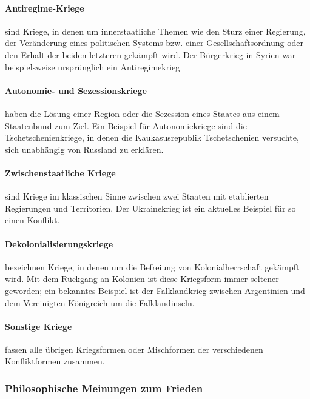 \documentclass{article}
\begin{document}
	\paragraph{Antiregime-Kriege}
	sind Kriege, in denen um innerstaatliche Themen wie den Sturz einer Regierung, der Veränderung eines politischen Systems bzw. einer Gesellschaftsordnung oder den Erhalt der beiden letzteren gekämpft wird. Der Bürgerkrieg in Syrien war beispielsweise ursprünglich ein Antiregimekrieg

	\paragraph{Autonomie- und Sezessionskriege}
	haben die Lösung einer Region oder die Sezession eines Staates aus einem Staatenbund zum Ziel. Ein Beispiel für Autonomiekriege sind die Tschetschenienkriege, in denen die Kaukasusrepublik Tschetschenien versuchte, sich unabhängig von Russland zu erklären.

	\paragraph{Zwischenstaatliche Kriege}
	sind Kriege im klassischen Sinne zwischen zwei Staaten mit etablierten Regierungen und Territorien. Der Ukrainekrieg ist ein aktuelles Beispiel für so einen Konflikt.

	\paragraph{Dekolonialisierungskriege}
	bezeichnen Kriege, in denen um die Befreiung von Kolonialherrschaft gekämpft wird. Mit dem Rückgang an Kolonien ist diese Kriegsform immer seltener geworden; ein bekanntes Beispiel ist der Falklandkrieg zwischen Argentinien und dem Vereinigten Königreich um die Falklandinseln.

	\paragraph{Sonstige Kriege}
	fassen alle übrigen Kriegsformen oder Mischformen der verschiedenen Konfliktformen zusammen.

	\subsubsection{Philosophische Meinungen zum Frieden}
\end{document}
